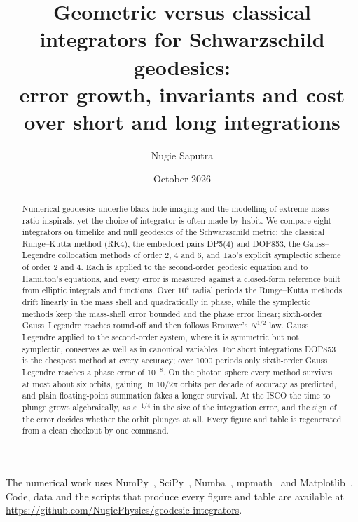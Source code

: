\documentclass[aps,prd,onecolumn,11pt,nofootinbib,superscriptaddress,floatfix]{revtex4-2}
\newcommand{\repo}{\url{https://github.com/NugiePhysics/geodesic-integrators}}
\begin{document}
\title{Geometric versus classical integrators for Schwarzschild geodesics:\\
error growth, invariants and cost over short and long integrations}

\author{Nugie Saputra}

\date{October 2026}

\begin{abstract}
Numerical geodesics underlie black-hole imaging and the modelling of extreme-mass-ratio
inspirals, yet the choice of integrator is often made by habit. We compare eight integrators
on timelike and null geodesics of the Schwarzschild metric: the classical Runge--Kutta method
(RK4), the embedded pairs DP5(4) and DOP853, the Gauss--Legendre collocation methods of order
2, 4 and 6, and Tao's explicit symplectic scheme of order 2 and 4. Each is applied to the
second-order geodesic equation and to Hamilton's equations, and every error is measured
against a closed-form reference built from elliptic integrals and functions. Over $10^4$
radial periods the Runge--Kutta methods drift linearly in the mass shell and quadratically in
phase, while the symplectic methods keep the mass-shell error bounded and the phase error
linear; sixth-order Gauss--Legendre reaches round-off and then follows Brouwer's
$N^{1/2}$ law. Gauss--Legendre applied to the second-order system, where it is symmetric but
not symplectic, conserves as well as in canonical variables. For short integrations DOP853 is
the cheapest method at every accuracy; over 1000 periods only sixth-order Gauss--Legendre
reaches a phase error of $10^{-8}$. On the photon sphere every method survives at most about
six orbits, gaining $\ln 10/2\pi$ orbits per decade of accuracy as predicted, and plain
floating-point summation fakes a longer survival. At the ISCO the time to plunge grows
algebraically, as $\varepsilon^{-1/4}$ in the size of the integration error, and the sign of
the error decides whether the orbit plunges at all. Every figure and table is regenerated from
a clean checkout by one command.
\end{abstract}

\maketitle









\begin{acknowledgments}
The numerical work uses NumPy~\cite{numpy}, SciPy~\cite{scipy}, Numba~\cite{numba},
mpmath~\cite{mpmath} and Matplotlib~\cite{matplotlib}. Code, data and the scripts that produce
every figure and table are available at \repo.
\end{acknowledgments}

\appendix



\end{document}
